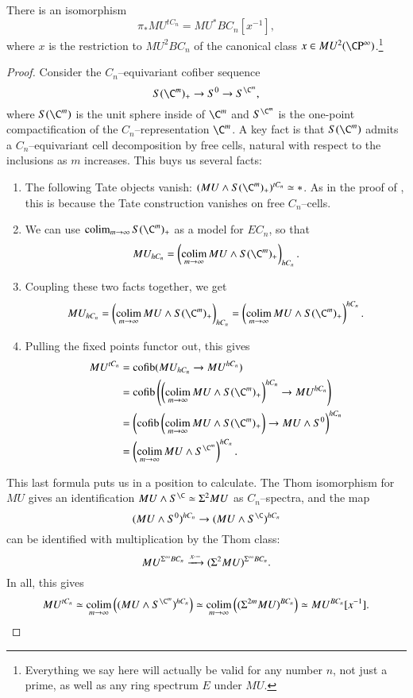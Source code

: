 \begin{theorem}\label{TateConstructionOnMU}
There is an isomorphism \[\pi_* MU^{tC_n} = MU^* BC_n[x^{-1}],\] where $x$ is the restriction to $MU^2 BC_n$ of the canonical class $x \in MU^2(\CP^\infty)$.\footnote{Everything we say here will actually be valid for any number $n$, not just a prime, as well as any ring spectrum $E$ under $MU$.}
\end{theorem}
\begin{proof}
Consider the $C_n$--equivariant cofiber sequence \[S(\C^m)_+ \to S^0 \to S^{\C^m},\] where $S(\C^m)$ is the unit sphere inside of $\C^m$ and $S^{\C^m}$ is the one-point compactification of the $C_n$--representation $\C^m$.  A key fact is that $S(\C^m)$ admits a $C_n$--equivariant cell decomposition by free cells, natural with respect to the inclusions as $m$ increases.  This buys us several facts:
\begin{enumerate}
    \item The following Tate objects vanish: $(MU \sm S(\C^m)_+)^{tC_n} \simeq *$.  As in the proof of , this is because the Tate construction vanishes on free $C_n$--cells.
    \item We can use $\colim_{m \to \infty} S(\C^m)_+$ as a model for $EC_n$, so that \[MU_{hC_n} = \left( \colim_{m \to \infty} MU \sm S(\C^m)_+ \right)_{hC_n}.\]
    \item Coupling these two facts together, we get \[MU_{hC_n} = \left( \colim_{m \to \infty} MU \sm S(\C^m)_+ \right)_{hC_n} = \left( \colim_{m \to \infty} MU \sm S(\C^m)_+ \right)^{hC_n}.\]
    \item Pulling the fixed points functor out, this gives
    \begin{align*}
    MU^{tC_n} & = \cofib(MU_{hC_n} \to MU^{hC_n}) \\
    & = \cofib\left(\left( \colim_{m \to \infty} MU \sm S(\C^m)_+ \right)^{hC_n} \to MU^{hC_n}\right) \\
    & = \left(\cofib\left( \colim_{m \to \infty} MU \sm S(\C^m)_+ \right) \to MU \sm S^0\right)^{hC_n} \\
    & = \left( \colim_{m \to \infty} MU \sm S^{\C^m} \right)^{hC_n}.
    \end{align*}
\end{enumerate}
This last formula puts us in a position to calculate.  The Thom isomorphism for $MU$ gives an identification $MU \sm S^{\C} \simeq \Susp^2 MU$ as $C_n$--spectra, and the map \[(MU \sm S^0)^{hC_n} \to (MU \sm S^{\C})^{hC_n}\] can be identified with multiplication by the Thom class: \[MU^{\Sigma^\infty BC_n} \xrightarrow{x \cdot -} (\Sigma^2 MU)^{\Sigma^\infty BC_n}.\]  In all, this gives \[MU^{tC_n} \simeq \colim_{m \to \infty} \left((MU \sm S^{\C^m})^{hC_n}\right) \simeq \colim_{m \to \infty} \left((\Susp^{2m} MU)^{BC_n}\right) \simeq MU^{BC_n}[x^{-1}]. \qedhere\]
\end{proof}

